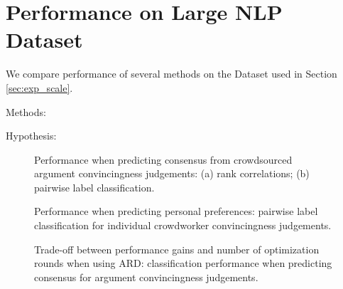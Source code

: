 \section{Performance on Large NLP Dataset}\label{sec:exp_nlp}

We compare performance of several methods on the Dataset used in Section \ref{sec:exp_scale}.

Methods: 

Hypothesis: 

\begin{figure}
\caption{Performance when predicting consensus from crowdsourced argument convincingness judgements:
(a) rank correlations; (b) pairwise label classification.
}
\end{figure}

\begin{figure}
\caption{Performance when predicting personal preferences: pairwise label classification for individual crowdworker
convincingness judgements.
}
\end{figure}

\begin{figure}
\caption{Trade-off between performance gains and number of optimization rounds when using ARD:
classification performance when predicting consensus for argument convincingness judgements. 
}
\end{figure}

